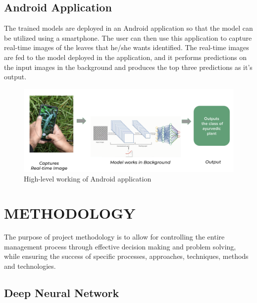 \section{Android Application}
The trained models are deployed in an Android application so that the model can be utilized using a smartphone. The user can then use this application to capture real-time images of the leaves that he/she wants identified. The real-time images are fed to the model deployed in the application, and it performs predictions on the input images in the background and produces the top three predictions as it's output. 

\begin{figure}[h]
	\label{ss}
	\centering
	\includegraphics[width=15cm]{android-app-working.png}
	\caption{High-level working of Android application}
\end{figure}

\chapter{METHODOLOGY}

The purpose of project methodology is to allow for controlling the entire management process through effective decision making and problem solving, while ensuring the success of specific processes, approaches, techniques, methods and technologies.

\section{Deep Neural Network }
